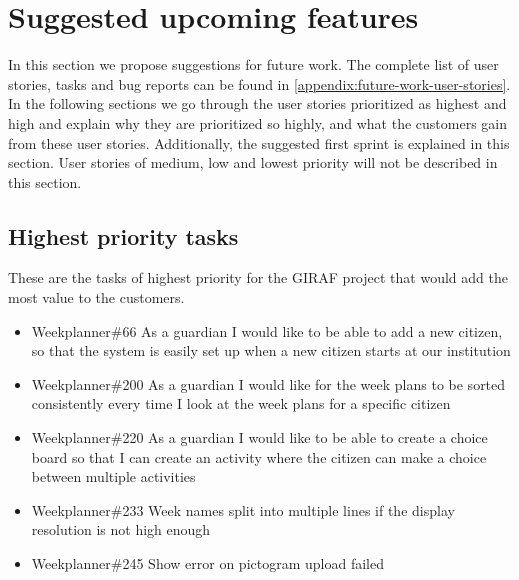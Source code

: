 \section{Suggested upcoming features}
In this section we propose suggestions for future work. 
The complete list of user stories, tasks and bug reports can be found in \autoref{appendix:future-work-user-stories}.
In the following sections we go through the user stories prioritized as highest and high and explain why they are prioritized so highly, and what the customers gain from these user stories.
Additionally, the suggested first sprint is explained in this section.
User stories of medium, low and lowest priority will not be described in this section.

\subsection{Highest priority tasks}\label{highest-priority-tasks}
These are the tasks of highest priority for the GIRAF project that would add the most value to the customers.

\begin{itemize}
    \item Weekplanner\#66 As a guardian I would like to be able to add a new citizen, so that the system is easily set up when a new citizen starts at our institution
    \item Weekplanner\#200 As a guardian I would like for the week plans to be sorted consistently every time I look at the week plans for a specific citizen
    \item Weekplanner\#220 As a guardian I would like to be able to create a choice board so that I can create an activity where the citizen can make a choice between multiple activities 
    \item Weekplanner\#233 Week names split into multiple lines if the display resolution is not high enough 
    \item Weekplanner\#245 Show error on pictogram upload failed
\end{itemize}

